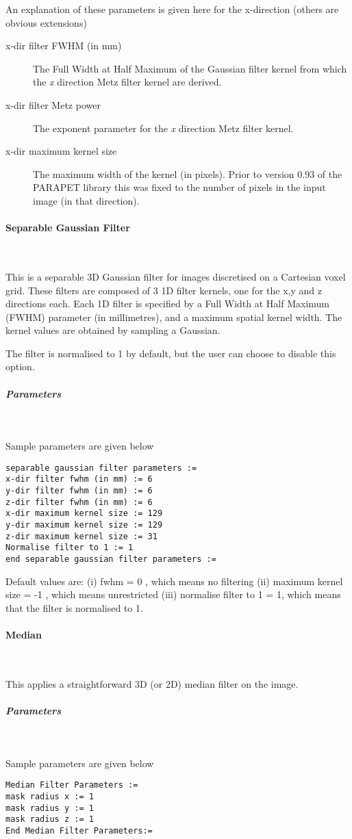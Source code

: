 \documentclass{article}
\newcommand{\subsubsubsection}[1]{\paragraph{#1}\mbox{} \\}
\newcommand{\subsubsubsubsection}[1]{\subparagraph{#1} \mbox{} \\}
\begin{document}
{{An explanation of these parameters is given here for the x-direction 
(others are obvious extensions)
\begin{description}
\item[x-dir filter FWHM (in mm)]
The Full Width at Half Maximum of the Gaussian filter kernel 
from which the \textit{x} direction Metz filter kernel are derived.

\item[x-dir filter Metz power]
The exponent parameter for the \textit{x} direction Metz filter kernel.

\item[x-dir maximum kernel size]
The maximum width of the kernel (in pixels). Prior to version 
0.93 of the PARAPET library this was fixed to the number of pixels 
in the input image (in that direction).
\end{description}

{ \subsubsubsection{Separable Gaussian Filter}
}
This is a separable 3D Gaussian filter for images discretised on
a Cartesian voxel grid. These filters are composed of 3 1D filter
kernels, one for the x,y and z directions each. Each 1D filter
is specified by a Full Width at Half Maximum (FWHM) parameter
(in millimetres), and a maximum spatial kernel width.
The kernel values are obtained by sampling a Gaussian.

The filter is normalised to 1 by default, but the user can choose to disable this option.


{ \subsubsubsubsection{Parameters}
}
Sample parameters are given below
\begin{verbatim}
separable gaussian filter parameters :=
x-dir filter fwhm (in mm) := 6
y-dir filter fwhm (in mm) := 6
z-dir filter fwhm (in mm) := 6
x-dir maximum kernel size := 129
y-dir maximum kernel size := 129
z-dir maximum kernel size := 31
Normalise filter to 1 := 1
end separable gaussian filter parameters :=
\end{verbatim}

Default values are:
(i) fwhm = 0 , which means no filtering
(ii) maximum kernel size = -1 , which means unrestricted
(iii) normalise filter to 1 = 1, which means that the filter is normalised to 1.

{ \subsubsubsection{Median}
}
\label{sec:median}
This applies a straightforward 3D (or 2D) median filter on the 
image.

{ \subsubsubsubsection{Parameters}
}
Sample parameters are given below
\begin{verbatim}
Median Filter Parameters := 
mask radius x := 1  
mask radius y := 1 
mask radius z := 1 
End Median Filter Parameters:=
\end{verbatim}


}}
\end{document}
